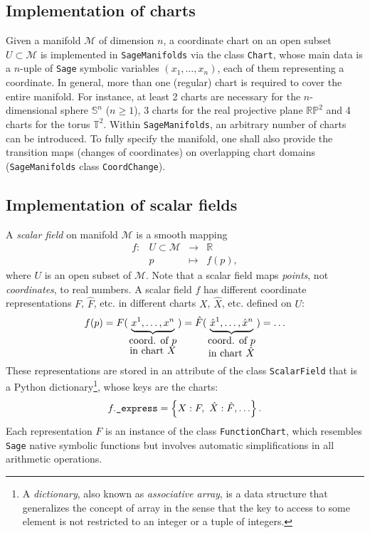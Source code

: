 \documentclass[a4paper]{jpconf}
\newcommand{\soft}[1]{\texttt{#1}}
\newcommand{\code}[1]{\texttt{#1}}
\newcommand{\Sage}{\soft{Sage}}
\newcommand{\SM}{\soft{SageManifolds}}
\newcommand{\be}{\begin{equation}}
\newcommand{\ee}{\end{equation}}
\begin{document}
\subsection{Implementation of charts}

Given a manifold $\mathcal{M}$ of dimension $n$, a coordinate chart 
on an open subset $U\subset\mathcal{M}$ is implemented in \SM{} 
via the class \code{Chart}, whose main data is 
a $n$-uple of \Sage{} symbolic variables $(x_1,\ldots,x_n)$, each of 
them representing a coordinate.
In general, more than one (regular) chart is required to cover the entire manifold.
For instance, at least 2 charts are necessary for the $n$-dimensional sphere 
$\mathbb{S}^n$ ($n\geq 1$), 3 charts for the real projective plane
$\mathbb{RP}^2$ and 4 charts for the torus $\mathbb{T}^2$.
Within \SM{}, an arbitrary number of charts can be introduced.
To fully specify the manifold, one shall also provide the transition maps
(changes of coordinates) on
overlapping chart domains (\SM{} class \code{CoordChange}).


\subsection{Implementation of scalar fields}

A \emph{scalar field} on manifold $\mathcal{M}$ is a smooth mapping
\be
    \begin{array}{lcll}
    f: & U\subset \mathcal{M}&\longrightarrow &\mathbb{R} \\
       & p & \longmapsto  & f(p) ,
    \end{array}
\ee
where $U$ is an open subset of $\mathcal{M}$.
Note that a scalar field maps \emph{points}, not \emph{coordinates}, to real numbers. 
A scalar field $f$ has different coordinate representations $F$, $\hat F$, etc. 
in different charts $X$, $\hat X$, etc. defined on $U$:
\be
    f(p) = 
F(\underbrace{x^1,\ldots, x^n}_{\mbox{coord. of $p$}\atop\mbox{in chart $X$}}) 
= {\hat F}(\underbrace{{\hat x}^1,\ldots, {\hat x}^n}_{\mbox{coord. of $p$}\atop\mbox{in chart $\hat X$}})
= \ldots
\ee
These representations are 
stored in an attribute of the class \code{ScalarField} that is a 
Python dictionary\footnote{A \emph{dictionary}, also known as \emph{associative array}, is a 
data structure that generalizes the concept of array in the sense that the
key to access to some element is not restricted to an integer or a tuple of integers.},
whose keys are the charts:
\be \label{e:f_express}
 f.\mbox{\texttt{\_express}} = \left\{ X: F,\ \hat X: \hat F, \ldots \right\} .
\ee
Each representation $F$ is an instance of the class \code{FunctionChart}, 
which resembles \Sage{} native symbolic functions but involves 
automatic simplifications in all arithmetic operations. 
\end{document}
